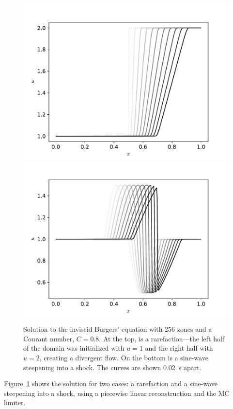 \begin{figure}[t]
\centering
\includegraphics[width=0.8\linewidth]{fv-burger-rarefaction} \\
\includegraphics[width=0.8\linewidth]{fv-burger-sine}
\caption[Solutions to the inviscid Burgers'
  equation.]{\label{fig:burgers} Solution to the inviscid Burgers'
  equation with 256 zones and a Courant number, $C = 0.8$.  At the
  top, is a rarefaction---the left half of the domain was initialized
  with $u = 1$ and the right half with $u = 2$, creating a divergent
  flow.  On the bottom is a sine-wave steepening into a shock.  The
  curves are shown 0.02~s apart. \\
  }
\end{figure}

Figure~\ref{fig:burgers} shows the solution for two cases: a rarefaction
and a sine-wave steepening into a shock, using a piecewise linear
reconstruction and the MC limiter.

